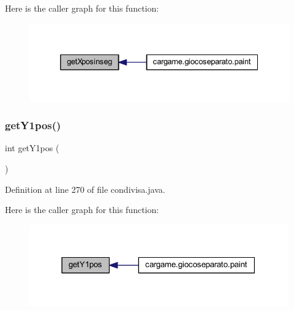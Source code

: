 Here is the caller graph for this function\+:
\nopagebreak
\begin{figure}[H]
\begin{center}
\leavevmode
\includegraphics[width=332pt]{classcargame_1_1condivisa_a97e507b46357fcce6770312f772fc347_icgraph}
\end{center}
\end{figure}
\mbox{\label{classcargame_1_1condivisa_a49e433a78f65839d0938617b9572e453}} 
\subsubsection{\texorpdfstring{get\+Y1pos()}{getY1pos()}}
{\footnotesize\ttfamily int get\+Y1pos (\begin{DoxyParamCaption}{ }\end{DoxyParamCaption})}



Definition at line 270 of file condivisa.\+java.

Here is the caller graph for this function\+:
\nopagebreak
\begin{figure}[H]
\begin{center}
\leavevmode
\includegraphics[width=316pt]{classcargame_1_1condivisa_a49e433a78f65839d0938617b9572e453_icgraph}
\end{center}
\end{figure}
\mbox{\label{classcargame_1_1condivisa_a70ced89b8879d050051033efae073c12}} 
